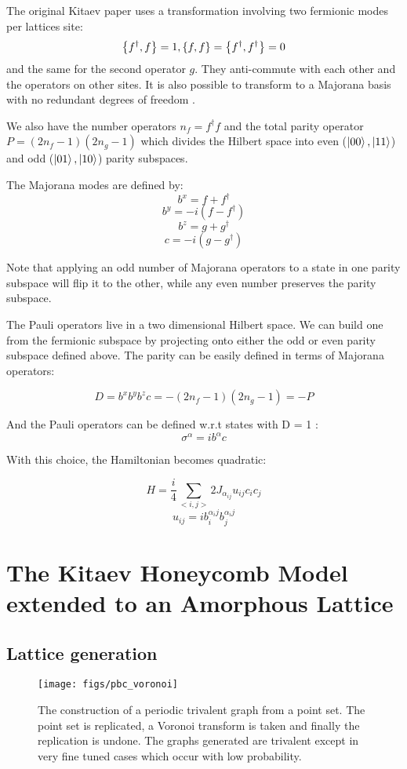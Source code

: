 The original Kitaev paper uses a transformation involving two fermionic modes per lattices site:
\[\acomm{f^\dagger}{f} = 1, \acomm{f}{f} = \acomm{f^\dagger}{f^\dagger} = 0\]
and the same for the second operator \(g\). They anti-commute with each other and the operators on other sites. It is also possible to transform to a Majorana basis with no redundant degrees of freedom \cite{fengTopologicalCharacterizationQuantum2007}.

We also have the number operators \(n_f = f^\dagger f\) and the total parity operator \(P = (2n_f - 1)(2n_g - 1)\) which divides the Hilbert space into even (\(\ket{00}, \ket{11}\)) and odd (\(\ket{01}, \ket{10}\)) parity subspaces. 

The Majorana modes are defined by:
\[b^x = f + f^\dagger\]
\[b^y = -i(f - f^\dagger)\]
\[b^z = g + g^\dagger\]
\[c = -i(g - g^\dagger)\]

Note that applying an odd number of Majorana operators to a state in one parity subspace will flip it to the other, while any even number preserves the parity subspace. 

The Pauli operators live in a two dimensional Hilbert space. We can build one from the fermionic subspace by projecting onto either the odd or even parity subspace defined above. The parity can be easily defined in terms of Majorana operators:

\[D = b^x b^y b^z c = - (2n_f - 1)(2n_g - 1) = - P\]

And the Pauli operators can be defined w.r.t states with D = 1 :
\[\sigma^\alpha = i b^\alpha c\]

With this choice, the Hamiltonian becomes quadratic:

\[H = \frac{i}{4} \sum_{<i,j>} 2 J_{\alpha_{ij}} u_{ij} c_i c_j\]
\[u_{ij} = i b^{\alpha_ij}_i b^{\alpha_ij}_j\]



\section{The Kitaev Honeycomb Model extended to an Amorphous Lattice}
\subsection{Lattice generation}
\begin{figure}
    \centering
    \texttt{[image: figs/pbc\_voronoi]}
    \caption{The construction of a periodic trivalent graph from a point set. The point set is replicated, a Voronoi transform is taken and finally the replication is undone. The graphs generated are trivalent except in very fine tuned cases which occur with low probability.}
    \label{fig:pbc_voronoi}
\end{figure}

